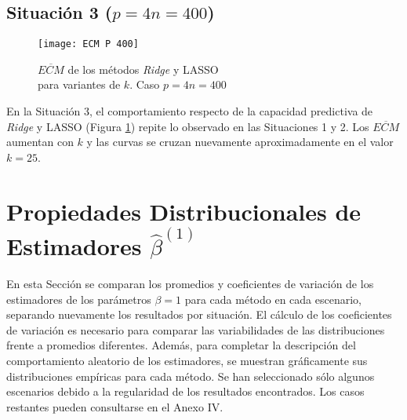 \documentclass[a4paper,12pt]{report}
\begin{document}
\subsection*{Situación 3 ($p=4n=400$)}

\begin{figure}[H]
	\centering
	\texttt{[image: ECM P 400]}
	\caption{$\overline{ECM}$ de los métodos \textit{Ridge} y LASSO \\ para variantes de $k$. Caso $p=4n=400$}
	\label{fig: ECM P400}
\end{figure}

En la Situación 3, el comportamiento respecto de la capacidad predictiva de \textit{Ridge} y LASSO  (Figura \ref{fig: ECM P400}) repite lo observado en las Situaciones 1 y 2. Los $\overline{ECM}$ aumentan con $k$ y las curvas se cruzan nuevamente aproximadamente en el valor $k=25$.

{
\section{Propiedades Distribucionales de Estimadores $\hat{\beta}^{(1)}$}}
En esta Sección se comparan los promedios y coeficientes de variación de los estimadores de los parámetros $\beta=1$ para cada método en cada escenario, separando nuevamente los resultados por situación. El cálculo de los coeficientes de variación es necesario para comparar las variabilidades de las distribuciones frente a promedios diferentes. Además, para completar la descripción del comportamiento aleatorio de los estimadores, se muestran gráficamente sus distribuciones empíricas para cada método. Se han seleccionado sólo algunos escenarios debido a la regularidad de los resultados encontrados. Los casos restantes pueden consultarse en el Anexo IV.
\end{document}
